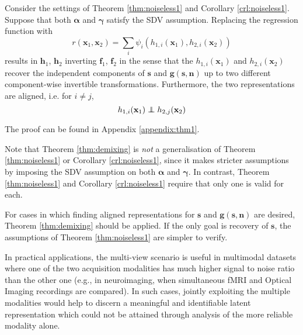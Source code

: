 \begin{theorem}\label{thm:demixing}
	Consider the settings of Theorem \ref{thm:noiseless1} and Corollary \ref{crl:noiseless1}.
	Suppose that both $\bm{\alpha}$ and $\bm{\gamma}$ satisfy the SDV assumption.
	Replacing the regression function with
	\begin{equation}\label{eqn:double-regression-fn}
	r(\bm{x}_{1},\bm{x}_{2})=\sum_{i}\psi_{i}(h_{1,i}(\bm{x}_{1}),h_{2,i}(\bm{x}_{2}))
	\end{equation}
	results in $\bm{h}_1$, $\bm{h}_2$ inverting $\bm{f}_1$, $\bm{f}_2$ in the sense that the $h_{1,i}(\bm{x}_1)$ and $h_{2,i}(\bm{x}_2)$ recover the independent components of $\bm{s}$ and $\bm{g}(\bm{s}, \bm{n})$ up to two different component-wise invertible transformations. Furthermore, the two representations are aligned, i.e. for $i\not=j$,
	\begin{equation*}
	h_{1,i}(\mathbf{x}_{1})\independent h_{2,j}(\mathbf{x}_{2})
	\end{equation*}
\end{theorem}
The proof can be found in Appendix \ref{appendix:thm1}.

Note that Theorem \ref{thm:demixing} is \emph{not} a generalisation of Theorem \ref{thm:noiseless1} or Corollary \ref{crl:noiseless1}, since it makes stricter assumptions by imposing the SDV assumption on both $\bm{\alpha}$ and $\bm{\gamma}$.
In contrast, Theorem \ref{thm:noiseless1} and Corollary \ref{crl:noiseless1} require that only one is valid for each.

For cases in which finding aligned representations for $\bm{s}$ and $\bm{g}(\bm{s}, \bm{n})$ are desired, Theorem \ref{thm:demixing} should be applied.
If the only goal is recovery of $\bm{s}$, the assumptions of Theorem \ref{thm:noiseless1} are simpler to verify.


In practical applications, the multi-view scenario is useful in multimodal datasets where one of the two acquisition modalities has much higher signal to noise ratio than the other one (e.g., in neuroimaging, when simultaneous fMRI and Optical Imaging recordings are compared). In such cases, jointly exploiting the multiple modalities would help to discern a meaningful and identifiable latent representation which could not be attained through analysis of the more reliable modality alone.


